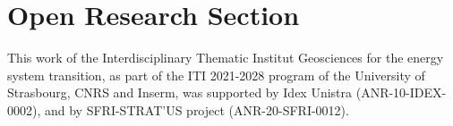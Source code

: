 \documentclass[draft]{agujournal2019}
\begin{document}
\section*{Open Research Section}

\acknowledgments
This work of the Interdisciplinary Thematic Institut Geosciences for the energy system transition, as part of the ITI 2021-2028 program of the University of Strasbourg, CNRS and Inserm, was supported by Idex Unistra (ANR-10-IDEX-0002), and by SFRI-STRAT'US project (ANR-20-SFRI-0012).


\end{document}
